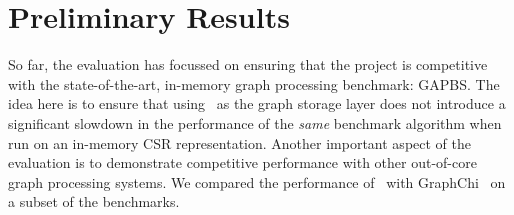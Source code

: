 



\section{Preliminary Results}
\label{eval:preliminary_results}
So far, the evaluation has focussed on ensuring that the \project{} project is competitive with the state-of-the-art, in-memory graph processing benchmark: \ac{GAPBS}.
The idea here is to ensure that using~\project{} as the graph storage layer does not introduce a significant slowdown in the performance of the \emph{same} benchmark algorithm when run on an in-memory CSR representation.
Another important aspect of the evaluation is to demonstrate competitive performance with other out-of-core graph processing systems.
We compared the performance of~\project{} with GraphChi~\cite{kyrola2012graphchi} on a subset of the benchmarks.

